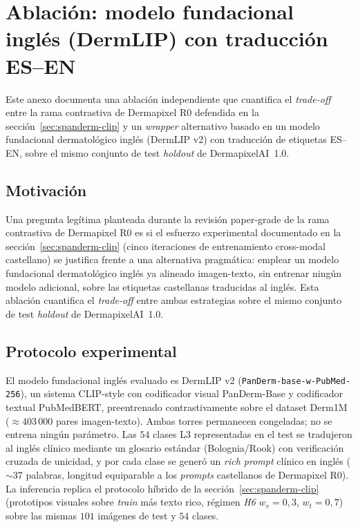 
\chapter{Ablación: modelo fundacional inglés (DermLIP) con
traducción ES--EN}
\label{cap:anexoi}

Este anexo documenta una ablación independiente que cuantifica el
\emph{trade-off} entre la rama contrastiva de Dermapixel R0
defendida en la
sección~\ref{sec:spanderm-clip} y un \emph{wrapper} alternativo
basado en un modelo fundacional dermatológico inglés (DermLIP v2)
con traducción de etiquetas ES--EN, sobre el mismo conjunto de test
\emph{holdout} de DermapixelAI~1.0.

\section{Motivación}
\label{sec:anexoi-motivacion}

Una pregunta legítima planteada durante la revisión paper-grade
de la rama contrastiva de Dermapixel R0 es si el esfuerzo experimental
documentado en la sección~\ref{sec:spanderm-clip} (cinco
iteraciones de entrenamiento cross-modal castellano) se justifica
frente a una alternativa pragmática: emplear un modelo fundacional
dermatológico inglés ya alineado imagen-texto, sin entrenar ningún
modelo adicional, sobre las etiquetas castellanas traducidas al
inglés. Esta ablación cuantifica el \emph{trade-off} entre ambas
estrategias sobre el mismo conjunto de test \emph{holdout} de
DermapixelAI~1.0.

\section{Protocolo experimental}
\label{sec:anexoi-protocolo}

El modelo fundacional inglés evaluado es DermLIP v2
(\texttt{PanDerm-base-w-PubMed-256}), un sistema CLIP-style con
codificador visual PanDerm-Base y codificador textual PubMedBERT,
preentrenado contrastivamente sobre el dataset
Derm1M~\cite{derm1m} ($\approx 403\,000$ pares imagen-texto).
Ambas torres permanecen congeladas; no se entrena ningún
parámetro. Las $54$ clases L3 representadas en el test se
tradujeron al inglés clínico mediante un glosario estándar
(Bolognia/Rook) con verificación cruzada de unicidad, y por cada
clase se generó un \emph{rich prompt} clínico en inglés ($\sim 37$
palabras, longitud equiparable a los \emph{prompts} castellanos
de Dermapixel R0). La inferencia replica el protocolo híbrido de
la sección~\ref{sec:spanderm-clip} (prototipos visuales sobre
\emph{train} más texto rico, régimen \emph{H6} $w_v = 0{,}3$,
$w_t = 0{,}7$) sobre las mismas $101$ imágenes de test y $54$
clases.

